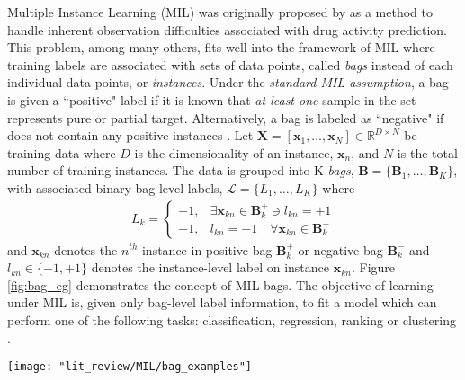 Multiple Instance Learning (MIL) was originally proposed by \cite{Dietterich1996AxisParallelRectangles} as a method to handle inherent observation difficulties associated with drug activity prediction.  This problem, among many others, fits well into the framework of MIL where training labels are associated with sets of data points, called \textit{bags} instead of each individual data points, or \textit{instances}.  Under the \textit{standard MIL assumption}, a bag is given a ``positive" label if it is known that  \textit{at least one} sample in the set represents pure or partial target.  Alternatively, a bag is labeled as ``negative" if does not contain any positive instances \citep{Carbonneau2016MILSurvey}.  Let $\bm{X}=[\bm{x}_1,\dots, \bm{x}_N] \in \mathbb{R}^{D \times N}$ be training data where $D$ is the dimensionality of an instance, $\bm{x}_n$, and $N$ is the total number of training instances.  The data is grouped into K \textit{bags}, $\bm{B} = \{\bm{B}_1, \dots, \bm{B}_K\}$, with associated binary bag-level labels, $\mathcal{L} = \{L_1, \dots, L_K \}$ where 
\begin{align}
	L_k = \begin{cases} 
	+1, & \exists \bm{x}_{kn} \in \bm{B}^{+}_{k} \ni  l_{kn} = +1\\
	-1, & l_{kn} = -1 \quad \forall \bm{x}_{kn} \in \bm{B}^{-}_{k} 
	\end{cases}
\end{align} and $\bm{x}_{kn}$ denotes the $n^{th}$ instance in positive bag $\bm{B}^{+}_{k}$ or negative bag $\bm{B}^{-}_{k}$ \citep{Zare2016MIACE} and $l_{kn} \in \{ -1, +1\}$ denotes the instance-level label on instance $\bm{x}_{kn}$.  Figure \ref{fig:bag_eg} demonstrates the concept of MIL bags.  The objective of learning under MIL is, given only bag-level label information, to fit a model which can perform one of the following tasks: classification, regression, ranking or clustering \citep{Carbonneau2016MILSurvey}.

\begin{center}
	\begin{figure*}[h]
		\centering
		\texttt{[image: "lit\_review/MIL/bag\_examples"]}
		\caption[Multiple instance learning bags.]{Illustration of example bags under the multiple instance learning framework.  Red ``plus signs" denote positive instances and blue ``negative signs" represent negative instances.  The two bags on the top row are labeled ``negative" because they only contain negative instances.  The three bags on the bottom row are ``positive" because they each contain at least one positive instance.}
		\label{fig:bag_eg}
	\end{figure*}
\end{center}

